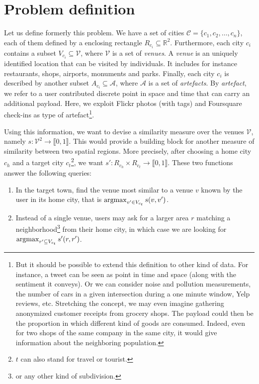 \section{Problem definition}
\label{sec:problem}

Let us define formerly this problem. We have a set of cities $\mathcal{C} =
\{c_1, c_2, \ldots, c_n\}$, each of them defined by a enclosing rectangle
$R_{c_i} \subseteq \mathbb{R}^2$. Furthermore, each city $c_i$ contains a
subset $V_{c_i} \subseteq \mathcal{V}$, where $\mathcal{V}$ is a set of
\emph{venues}. A \emph{venue} is an uniquely identified location that can be
visited by individuals. It includes for instance restaurants, shops, airports,
monuments and parks. Finally, each city $c_i$ is described by another subset
$A_{c_i} \subseteq \mathcal{A}$, where $\mathcal{A}$ is a
set of \emph{artefacts}. By \emph{artefact}, we refer to a user contributed
discrete point in space and time that can carry an additional payload. Here,
we exploit Flickr photos (with tags) and Foursquare check-ins as type of
artefact\footnote{But it should be possible to extend this definition to other
	kind of data. For instance, a tweet can be seen as point in time and
	space (along with the sentiment it conveys). Or we can consider noise
	and pollution measurements, the number of cars in a given intersection
	during a one minute window, Yelp reviews, etc. Stretching the concept,
	we may even imagine gathering anonymized customer receipts from
	grocery shops.  The payload could then be the proportion in which
	different kind of goods are consumed. Indeed, even for two shops of
	the same company in the same city, it would give information about the
neighboring population.}.

Using this information, we want to devise a similarity measure over the venues
$\mathcal{V}$, namely
 $s: \mathcal{V}^2 \rightarrow \llbracket 0, 1 \rrbracket $. This would
provide a building block for another measure of similarity between two spatial
regions. More precisely, after choosing a home city $c_h$ and a target city
$c_t$\footnote{$t$ can also stand for travel or tourist.}, we want
$s': R_{c_h} \times R_{c_t} \rightarrow \llbracket 0, 1 \rrbracket$.
These two functions answer the following queries:

\begin{enumerate}
\item In the target town, find the venue most similar to a venue $v$ known by
	the user in its home city, that is $\operatorname*{argmax}_{v' \in V_{c_t}} s(v,
	v')$.\label{q:point}
\item Instead of a single venue, users may ask for a larger area $r$ matching a
	neighborhood\footnote{or any other kind of subdivision.} from their home
	city, in which case we are looking for $\operatorname*{argmax}_{r' \subseteq V_{c_t}}
	s'(r, r')$.\label{q:space}
\end{enumerate}

